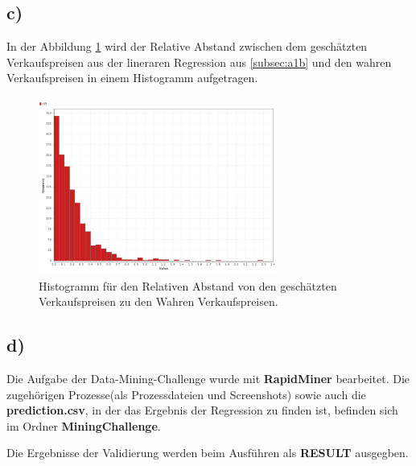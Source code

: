 \subsection{c)}
\label{subsec:a1c}
In der Abbildung \ref{fig:hist} wird der Relative Abstand zwischen dem geschätzten Verkaufspreisen aus
der lineraren Regression aus \ref{subsec:a1b} und den wahren Verkaufspreisen in einem
Histogramm aufgetragen.

\FloatBarrier

\begin{figure}
  \centering
  \includegraphics[width=0.7\textwidth]{histogramm.png}
  \caption{Histogramm für den Relativen Abstand von den geschätzten Verkaufspreisen
  zu den Wahren Verkaufspreisen.}
  \label{fig:hist}
\end{figure}

\FloatBarrier



\subsection{d)}
\label{subsec:a1d}
Die Aufgabe der Data-Mining-Challenge wurde mit \textbf{RapidMiner} bearbeitet.
Die zugehörigen Prozesse(als Prozessdateien und Screenshots) sowie auch die \textbf{prediction.csv}, in der das Ergebnis der
Regression zu finden ist, befinden sich im Ordner \textbf{MiningChallenge}.


Die Ergebnisse der Validierung werden beim Ausführen als \textbf{RESULT} ausgegben.
